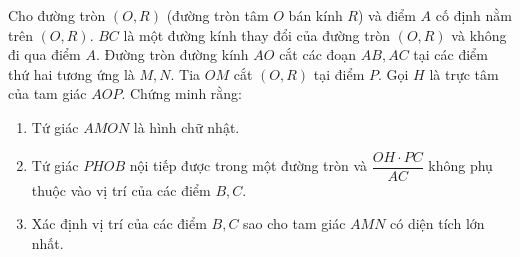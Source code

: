 \begin{bt}%
	Cho đường tròn $\left(O,R\right)$ (đường tròn tâm $O$ bán kính $R$) và điểm $A$ cố định nằm trên $\left(O,R\right)$. $BC$ là một đường kính thay đổi của đường tròn $\left(O,R\right)$ và không đi qua điểm $A$. Đường tròn đường kính $AO$ cắt các đoạn $AB, AC$ tại các điểm thứ hai tương ứng là $M, N$. Tia $OM$ cắt $\left(O,R\right)$ tại điểm $P$. Gọi $H$ là trực tâm của tam giác $AOP$. Chứng minh rằng:
	\begin{enumerate}
		\item 
		Tứ giác $AMON$ là hình chữ nhật.
		\item 
		Tứ giác $PHOB$ nội tiếp được trong một đường tròn và $\dfrac{OH\cdot PC}{AC}$ không phụ thuộc vào vị trí của các điểm $B, C$.
		\item
		Xác định vị trí của các điểm $B,C$ sao cho tam giác $AMN$ có diện tích lớn nhất.
	\end{enumerate}		
\end{bt}
